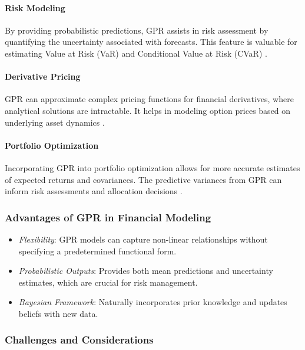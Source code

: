 \paragraph{Risk Modeling}

By providing probabilistic predictions, GPR assists in risk assessment by quantifying the uncertainty associated with forecasts. This feature is valuable for estimating Value at Risk (VaR) and Conditional Value at Risk (CVaR) \cite{shen2014gaussian}.

\paragraph{Derivative Pricing}

GPR can approximate complex pricing functions for financial derivatives, where analytical solutions are intractable. It helps in modeling option prices based on underlying asset dynamics \cite{bennell2006gaussian}.

\paragraph{Portfolio Optimization}

Incorporating GPR into portfolio optimization allows for more accurate estimates of expected returns and covariances. The predictive variances from GPR can inform risk assessments and allocation decisions \cite{marcellino2020gaussian}.

\subsubsection{Advantages of GPR in Financial Modeling}

\begin{itemize}
    \item \textit{Flexibility}: GPR models can capture non-linear relationships without specifying a predetermined functional form.
    \item \textit{Probabilistic Outputs}: Provides both mean predictions and uncertainty estimates, which are crucial for risk management.
    \item \textit{Bayesian Framework}: Naturally incorporates prior knowledge and updates beliefs with new data.
\end{itemize}

\subsubsection{Challenges and Considerations}

